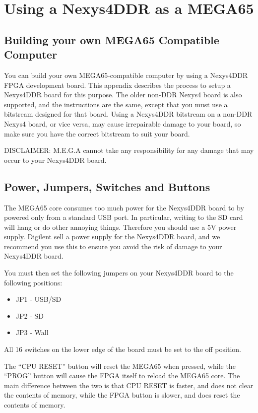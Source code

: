 \chapter{Using a Nexys4DDR as a MEGA65}

\section{Building your own MEGA65 Compatible Computer}

You can build your own MEGA65-compatible computer by using a Nexys4DDR FPGA development board.
This appendix describes the process to setup a Nexys4DDR board for this purpose.
The older non-DDR Nexys4 board is also supported, and the instructions are the same, except that
you must use a bitstream designed for that board.
Using a Nexys4DDR bitstream on a non-DDR Nexys4 board, or vice versa, may cause irrepairable damage to your board, so make sure
you have the correct bitstream to suit your board.


DISCLAIMER: M.E.G.A cannot take any responsibility for any damage that may occur to your Nexys4DDR board.


\section{Power, Jumpers, Switches and Buttons}

The MEGA65 core consumes too much power for the Nexys4DDR board to by powered only from a standard USB port.
In particular, writing to the SD card will hang or do other annoying things.
Therefore you should use a 5V power supply.
Digilent sell a power supply for the Nexys4DDR board, and we recommend you use this to ensure you avoid the risk of damage
to your Nexys4DDR board.

You must then set the following jumpers on your Nexys4DDR board to the following positions:

\begin{itemize}
\item{JP1} - USB/SD
\item{JP2} - SD
\item {JP3} - Wall
\end{itemize}


All 16 switches on the lower edge of the board must be set to the off position.

The ``CPU RESET'' button will reset the MEGA65 when pressed, while the ``PROG'' button will cause the FPGA itself to reload the MEGA65
core.  The main difference between the two is that CPU RESET is faster, and does not clear the contents of memory, while the FPGA button
is slower, and does reset the contents of memory.

